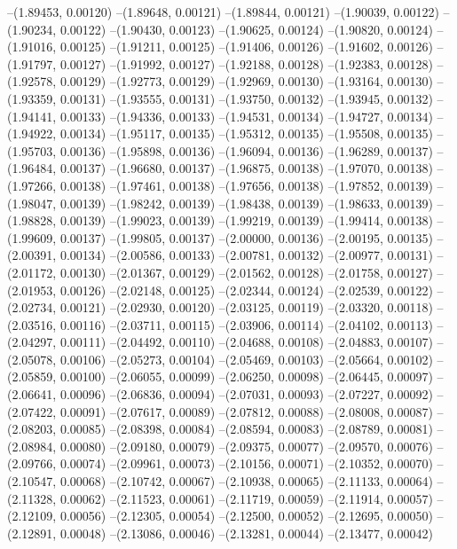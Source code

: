 --(1.89453, 0.00120)
--(1.89648, 0.00121)
--(1.89844, 0.00121)
--(1.90039, 0.00122)
--(1.90234, 0.00122)
--(1.90430, 0.00123)
--(1.90625, 0.00124)
--(1.90820, 0.00124)
--(1.91016, 0.00125)
--(1.91211, 0.00125)
--(1.91406, 0.00126)
--(1.91602, 0.00126)
--(1.91797, 0.00127)
--(1.91992, 0.00127)
--(1.92188, 0.00128)
--(1.92383, 0.00128)
--(1.92578, 0.00129)
--(1.92773, 0.00129)
--(1.92969, 0.00130)
--(1.93164, 0.00130)
--(1.93359, 0.00131)
--(1.93555, 0.00131)
--(1.93750, 0.00132)
--(1.93945, 0.00132)
--(1.94141, 0.00133)
--(1.94336, 0.00133)
--(1.94531, 0.00134)
--(1.94727, 0.00134)
--(1.94922, 0.00134)
--(1.95117, 0.00135)
--(1.95312, 0.00135)
--(1.95508, 0.00135)
--(1.95703, 0.00136)
--(1.95898, 0.00136)
--(1.96094, 0.00136)
--(1.96289, 0.00137)
--(1.96484, 0.00137)
--(1.96680, 0.00137)
--(1.96875, 0.00138)
--(1.97070, 0.00138)
--(1.97266, 0.00138)
--(1.97461, 0.00138)
--(1.97656, 0.00138)
--(1.97852, 0.00139)
--(1.98047, 0.00139)
--(1.98242, 0.00139)
--(1.98438, 0.00139)
--(1.98633, 0.00139)
--(1.98828, 0.00139)
--(1.99023, 0.00139)
--(1.99219, 0.00139)
--(1.99414, 0.00138)
--(1.99609, 0.00137)
--(1.99805, 0.00137)
--(2.00000, 0.00136)
--(2.00195, 0.00135)
--(2.00391, 0.00134)
--(2.00586, 0.00133)
--(2.00781, 0.00132)
--(2.00977, 0.00131)
--(2.01172, 0.00130)
--(2.01367, 0.00129)
--(2.01562, 0.00128)
--(2.01758, 0.00127)
--(2.01953, 0.00126)
--(2.02148, 0.00125)
--(2.02344, 0.00124)
--(2.02539, 0.00122)
--(2.02734, 0.00121)
--(2.02930, 0.00120)
--(2.03125, 0.00119)
--(2.03320, 0.00118)
--(2.03516, 0.00116)
--(2.03711, 0.00115)
--(2.03906, 0.00114)
--(2.04102, 0.00113)
--(2.04297, 0.00111)
--(2.04492, 0.00110)
--(2.04688, 0.00108)
--(2.04883, 0.00107)
--(2.05078, 0.00106)
--(2.05273, 0.00104)
--(2.05469, 0.00103)
--(2.05664, 0.00102)
--(2.05859, 0.00100)
--(2.06055, 0.00099)
--(2.06250, 0.00098)
--(2.06445, 0.00097)
--(2.06641, 0.00096)
--(2.06836, 0.00094)
--(2.07031, 0.00093)
--(2.07227, 0.00092)
--(2.07422, 0.00091)
--(2.07617, 0.00089)
--(2.07812, 0.00088)
--(2.08008, 0.00087)
--(2.08203, 0.00085)
--(2.08398, 0.00084)
--(2.08594, 0.00083)
--(2.08789, 0.00081)
--(2.08984, 0.00080)
--(2.09180, 0.00079)
--(2.09375, 0.00077)
--(2.09570, 0.00076)
--(2.09766, 0.00074)
--(2.09961, 0.00073)
--(2.10156, 0.00071)
--(2.10352, 0.00070)
--(2.10547, 0.00068)
--(2.10742, 0.00067)
--(2.10938, 0.00065)
--(2.11133, 0.00064)
--(2.11328, 0.00062)
--(2.11523, 0.00061)
--(2.11719, 0.00059)
--(2.11914, 0.00057)
--(2.12109, 0.00056)
--(2.12305, 0.00054)
--(2.12500, 0.00052)
--(2.12695, 0.00050)
--(2.12891, 0.00048)
--(2.13086, 0.00046)
--(2.13281, 0.00044)
--(2.13477, 0.00042)
